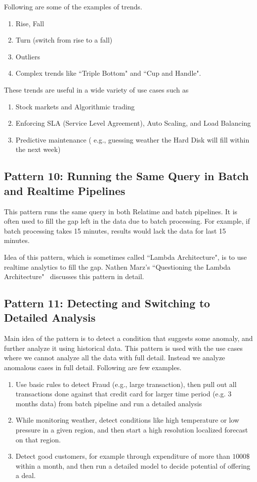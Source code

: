 \documentclass{sig-alternate}
\begin{document}
Following are some of the examples of trends. 

\begin{enumerate}
\item Rise, Fall
\item Turn (switch from rise to a fall)
\item Outliers
\item Complex trends like ``Triple Bottom" and ``Cup and Handle".
\end{enumerate}

These trends are useful in a wide variety of use cases such as 

\begin{enumerate}
\item Stock markets and Algorithmic trading 
\item Enforcing SLA (Service Level Agreement), Auto Scaling, and Load Balancing 
\item Predictive maintenance ( e.g., guessing weather the Hard Disk will fill within the next week)   
\end{enumerate}

\subsection{Pattern 10: Running the Same Query in Batch and Realtime Pipelines}

This pattern runs the same query in both Relatime and batch pipelines. It is often used to fill the gap left in the data due to batch processing. For example, if batch processing takes 15 minutes, results would lack the data for last 15 minutes. 

Idea of this pattern, which is sometimes called ``Lambda Architecture", is to use realtime analytics to fill the gap. Nathen Marz's ``Questioning the Lambda Architecture"~\cite{lambdaQ} discusses this pattern in detail.


\subsection{Pattern 11: Detecting and Switching to Detailed Analysis}
Main idea of the pattern is to detect a condition that suggests some anomaly, and further analyze it using historical data.  This pattern is used with the use cases where we cannot analyze all the data with full detail. Instead we analyze anomalous cases in full detail. Following are few examples. 

\begin{enumerate}
\item Use basic rules to detect Fraud (e.g., large transaction), then pull out all transactions done against that credit card for larger time period (e.g. 3 months data) from batch pipeline and run a detailed analysis 
\item While monitoring weather, detect conditions like high temperature or low pressure in a given region, and then start a high resolution localized forecast on that region. 
\item Detect good customers, for example through expenditure of more than $1000\$$ within a month, and then run a detailed model to decide potential of offering a deal. 
\end{enumerate}
\end{document}
